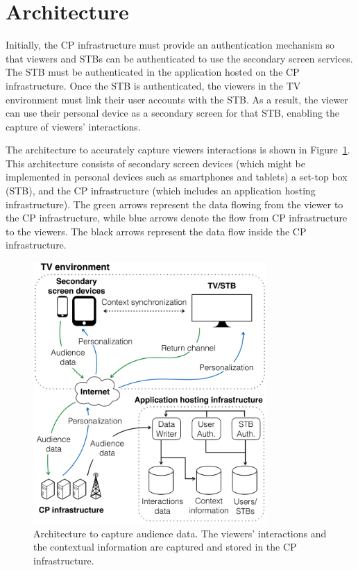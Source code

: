 \documentclass[conference,a4paper]{IEEEtran}
\begin{document}
\section{Architecture}

Initially, the CP infrastructure must provide an authentication mechanism so that viewers and STBs can be authenticated to use the secondary screen services. The STB must be authenticated in the application hosted on the CP infrastructure. Once the STB is authenticated, the viewers in the TV environment must link their user accounts with the STB. As a result, the viewer can use their personal device as a secondary screen for that STB, enabling the capture of viewers' interactions.

The architecture to accurately capture viewers interactions is shown in Figure~\ref{fig_architecture}. This architecture consists of secondary screen devices (which might be implemented in personal devices such as smartphones and tablets) a set-top box (STB), and the CP infrastructure (which includes an application hosting infrastructure). The green arrows represent the data flowing from the viewer to the CP infrastructure, while blue arrows denote the flow from CP infrastructure to the viewers. The black arrows represent the data flow inside the CP infrastructure.

\begin{figure}[!t]
	\centering
	\includegraphics[width=3.5in]{img/architecture.pdf}
	\caption{Architecture to capture audience data. The viewers' interactions and the contextual information are captured and stored in the CP infrastructure.}
	\label{fig_architecture}
\end{figure}
\end{document}
